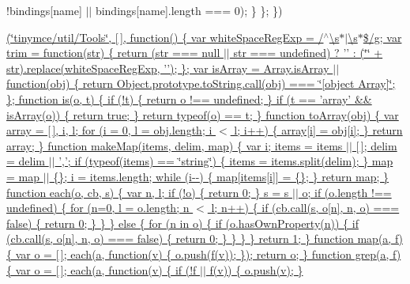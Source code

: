 \begin{DoxyCompactItemize}
{!bindings\mbox{[}name\mbox{]} $\vert$$\vert$ bindings\mbox{[}name\mbox{]}.\+length === 0); \} \}; \})}
\item 
\hyperlink{_2_applications_2_m_a_m_p_2htdocs_2_singer_france__s_v_n_2src_2_acme_group_2_labo_bundle_2_resou3db5accc9fc7672900eb739d177bdb1e}{(\char`\"{}tinymce/util/\+Tools\char`\"{}, \mbox{[}$\,$\mbox{]}, function() \{  var white\+Space\+Reg\+Exp = /$^\wedge$\textbackslash{}s$\ast$$\vert$\textbackslash{}s$\ast$\$/g; var trim = function(str) \{ return (str === null $\vert$$\vert$ str === undefined) ? '' \+: (\char`\"{}\char`\"{} + str).\+replace(white\+Space\+Reg\+Exp, ''); \};  var is\+Array = Array.\+is\+Array $\vert$$\vert$ function(obj) \{ return Object.\+prototype.\+to\+String.\+call(obj) === \char`\"{}\mbox{[}object Array\mbox{]}\char`\"{}; \};  function is(o, t) \{ if (!t) \{ return o !== undefined; \} if (t == 'array' \&\& is\+Array(o)) \{ return true; \} return typeof(o) == t; \}  function to\+Array(obj) \{ var array = \mbox{[}$\,$\mbox{]}, i, l; for (i = 0, l = obj.\+length; i $<$ l; i++) \{ array\mbox{[}i\mbox{]} = obj\mbox{[}i\mbox{]}; \} return array; \}  function make\+Map(items, delim, map) \{ var i; items = items $\vert$$\vert$ \mbox{[}$\,$\mbox{]}; delim = delim $\vert$$\vert$ ','; if (typeof(items) == \char`\"{}string\char`\"{}) \{ items = items.\+split(delim); \} map = map $\vert$$\vert$ \{\}; i = items.\+length; while (i-\/-\/) \{ map\mbox{[}items\mbox{[}i\mbox{]}\mbox{]} = \{\}; \} return map; \}  function each(o, cb, s) \{ var n, l; if (!o) \{ return 0; \} s = s $\vert$$\vert$ o; if (o.\+length !== undefined) \{  for (n=0, l = o.\+length; n $<$ l; n++) \{ if (cb.\+call(s, o\mbox{[}n\mbox{]}, n, o) === false) \{ return 0; \} \} \} else \{  for (n in o) \{ if (o.\+has\+Own\+Property(n)) \{ if (cb.\+call(s, o\mbox{[}n\mbox{]}, n, o) === false) \{ return 0; \} \} \} \} return 1; \}  function map(a, f) \{ var o = \mbox{[}$\,$\mbox{]}; each(a, function(v) \{
			o.\+push(f(v));
		\}); return o; \}  function grep(a, f) \{ var o = \mbox{[}$\,$\mbox{]}; each(a, function(v) \{
			if (!f $\vert$$\vert$ f(v)) \{
				o.\+push(v);
			\}
}
\end{DoxyCompactItemize}
